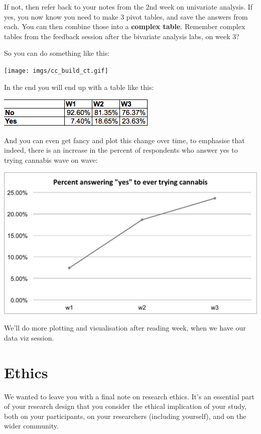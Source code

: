\documentclass[
]{book}
\begin{document}
If not, then refer back to your notes from the 2nd week on univariate analysis. If yes, you now know you need to make 3 pivot tables, and save the answers from each. You can then combine those into a \textbf{complex table}. Remember complex tables from the feedback session after the bivariate analysis labs, on week 3?

So you can do something like this:

\texttt{[image: imgs/cc\_build\_ct.gif]}

In the end you will end up with a table like this:

\includegraphics{imgs/final_cc_ct.png}

And you can even get fancy and plot this change over time, to emphasise that indeed, there is an increase in the percent of respondents who answer yes to trying cannabis wave on wave:

\includegraphics{imgs/incr_yes_can.png}

We'll do more plotting and visualisation after reading week, when we have our data viz session.

\hypertarget{ethics}{%
\section{Ethics}\label{ethics}}

We wanted to leave you with a final note on research ethics. It's an essential part of your research design that you consider the ethical implication of your study, both on your participants, on your researchers (including yourself), and on the wider community.
\end{document}
